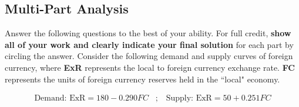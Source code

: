 \documentclass[12pt]{exam}
\begin{document}
\begin{questions}
\newpage
\section*{Multi-Part Analysis}
Answer the following questions to the best of your ability.
For full credit, \textbf{show all of your work and clearly indicate your final solution} for each part by circling the answer.
\question
Consider the following demand and supply curves of foreign currency, where \textbf{ExR} represents the local to foreign currency exchange rate.
\textbf{FC} represents the units of foreign currency reserves held in the ``local" economy.

\begin{align*}
    \text{Demand:} \text{ ExR} = 180 - 0.290FC \;\;\; ; \;\;\; \text{Supply:} \text{ ExR} = 50 + 0.251FC
\end{align*}

\end{questions}
\end{document}
